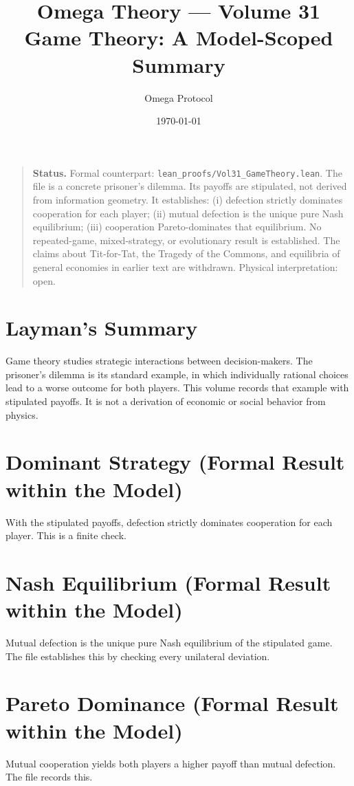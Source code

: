 \documentclass[11pt, a4paper]{article}
\title{Omega Theory --- Volume 31\\\Large Game Theory: A Model-Scoped Summary}
\author{Omega Protocol}
\date{\today}
\begin{document}
\maketitle

\begin{quote}
\textbf{Status.} Formal counterpart: \texttt{lean\_proofs/Vol31\_GameTheory.lean}. The file is a concrete prisoner's dilemma. Its payoffs are stipulated, not derived from information geometry. It establishes: (i) defection strictly dominates cooperation for each player; (ii) mutual defection is the unique pure Nash equilibrium; (iii) cooperation Pareto-dominates that equilibrium. No repeated-game, mixed-strategy, or evolutionary result is established. The claims about Tit-for-Tat, the Tragedy of the Commons, and equilibria of general economies in earlier text are withdrawn. Physical interpretation: open.
\end{quote}

\section*{Layman's Summary}
Game theory studies strategic interactions between decision-makers. The prisoner's dilemma is its standard example, in which individually rational choices lead to a worse outcome for both players. This volume records that example with stipulated payoffs. It is not a derivation of economic or social behavior from physics.

\section{Dominant Strategy (Formal Result within the Model)}
With the stipulated payoffs, defection strictly dominates cooperation for each player. This is a finite check.

\section{Nash Equilibrium (Formal Result within the Model)}
Mutual defection is the unique pure Nash equilibrium of the stipulated game. The file establishes this by checking every unilateral deviation.

\section{Pareto Dominance (Formal Result within the Model)}
Mutual cooperation yields both players a higher payoff than mutual defection. The file records this.
\end{document}
